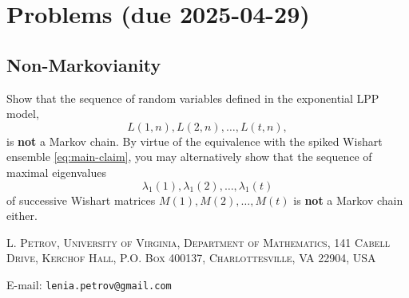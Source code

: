 \documentclass[letterpaper,11pt,oneside,reqno]{article}
\numberwithin{equation}{section}
\theoremstyle{definition}
\begin{document}
\appendix
\setcounter{section}{13}

\section{Problems (due 2025-04-29)}

\subsection{Non-Markovianity}

Show that the sequence of random variables defined in the exponential LPP model,
\[
L(1,n),L(2,n),\dots,L(t,n),
\]
is \textbf{not} a Markov chain.
By virtue of the equivalence with the spiked Wishart ensemble \eqref{eq:main-claim},
you may alternatively show that the sequence
of maximal eigenvalues
\[
\lambda_1(1),\lambda_1(2),\dots,\lambda_1(t)
\]
of successive
Wishart matrices $M(1),M(2),\dots,M(t)$ is \textbf{not} a Markov chain either.








\medskip

\textsc{L. Petrov, University of Virginia, Department of Mathematics, 141 Cabell Drive, Kerchof Hall, P.O. Box 400137, Charlottesville, VA 22904, USA}

E-mail: \texttt{lenia.petrov@gmail.com}
\end{document}
